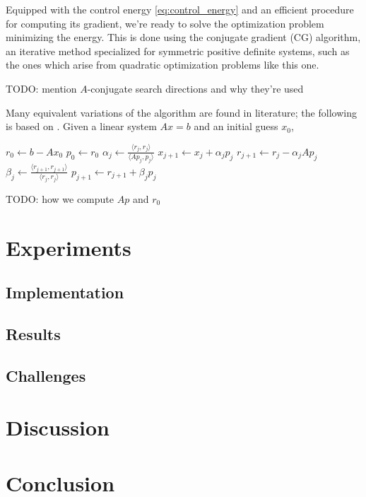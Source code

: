 \documentclass[utf8,english]{gradu3}
\begin{document}
Equipped with the control energy \eqref{eq:control_energy}
and an efficient procedure for computing its gradient,
we're ready to solve the optimization problem minimizing the energy.
This is done using the conjugate gradient (CG) algorithm,
an iterative method specialized for symmetric positive definite systems,
such as the ones which arise from quadratic optimization problems like this one.

TODO: mention $A$-conjugate search directions and why they're used

Many equivalent variations of the algorithm are found in literature;
the following is based on \parencite{saad_iterative_2003}.
Given a linear system $Ax = b$ and an initial guess $x_0$,

\begin{algorithmic}[1]
  \State $r_0 \gets b - Ax_0$ 
  \State $p_0 \gets r_0$ 
    \State $\alpha_j \gets \frac{\langle r_j, r_j \rangle}{\langle Ap_j, p_j\rangle}$
    \State $x_{j+1} \gets x_j + \alpha_j p_j$
    \State $r_{j+1} \gets r_j - \alpha_j Ap_j$
    \State $\beta_j \gets \frac{\langle r_{j+1}, r_{j+1} \rangle}{\langle r_j, r_j \rangle}$
    \State $p_{j+1} \gets r_{j+1} + \beta_j p_j$
  \EndFor
\end{algorithmic}

TODO: how we compute $Ap$ and $r_0$


\chapter{Experiments}\label{cha:experiments}

\section{Implementation}

\section{Results}

\section{Challenges}




\chapter{Discussion}



\chapter{Conclusion}



\hfuzz=4pt
\printbibliography
\hfuzz=0pt
\end{document}
